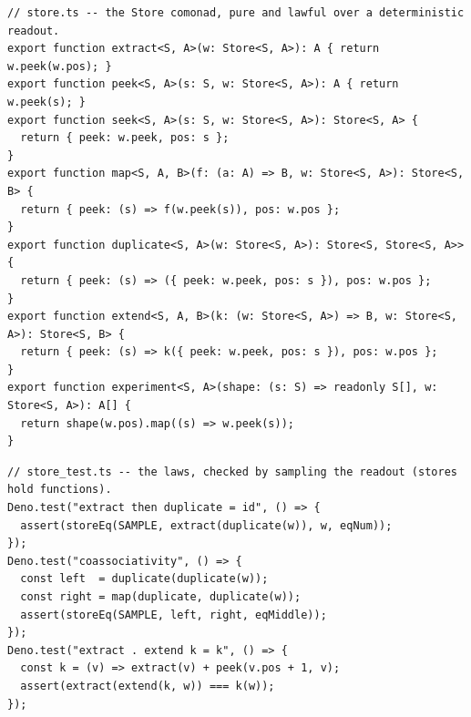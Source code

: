 \documentclass[11pt]{article}
\begin{document}
\begin{lstlisting}
// store.ts -- the Store comonad, pure and lawful over a deterministic readout.
export function extract<S, A>(w: Store<S, A>): A { return w.peek(w.pos); }
export function peek<S, A>(s: S, w: Store<S, A>): A { return w.peek(s); }
export function seek<S, A>(s: S, w: Store<S, A>): Store<S, A> {
  return { peek: w.peek, pos: s };
}
export function map<S, A, B>(f: (a: A) => B, w: Store<S, A>): Store<S, B> {
  return { peek: (s) => f(w.peek(s)), pos: w.pos };
}
export function duplicate<S, A>(w: Store<S, A>): Store<S, Store<S, A>> {
  return { peek: (s) => ({ peek: w.peek, pos: s }), pos: w.pos };
}
export function extend<S, A, B>(k: (w: Store<S, A>) => B, w: Store<S, A>): Store<S, B> {
  return { peek: (s) => k({ peek: w.peek, pos: s }), pos: w.pos };
}
export function experiment<S, A>(shape: (s: S) => readonly S[], w: Store<S, A>): A[] {
  return shape(w.pos).map((s) => w.peek(s));
}
\end{lstlisting}

\begin{lstlisting}
// store_test.ts -- the laws, checked by sampling the readout (stores hold functions).
Deno.test("extract then duplicate = id", () => {
  assert(storeEq(SAMPLE, extract(duplicate(w)), w, eqNum));
});
Deno.test("coassociativity", () => {
  const left  = duplicate(duplicate(w));
  const right = map(duplicate, duplicate(w));
  assert(storeEq(SAMPLE, left, right, eqMiddle));
});
Deno.test("extract . extend k = k", () => {
  const k = (v) => extract(v) + peek(v.pos + 1, v);
  assert(extract(extend(k, w)) === k(w));
});
\end{lstlisting}
\end{document}
